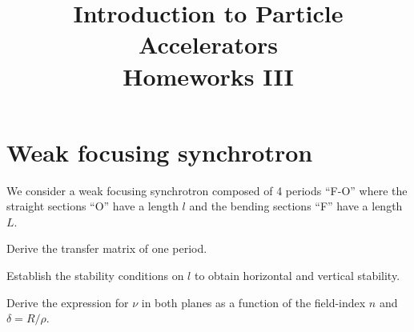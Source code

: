 \documentclass[12pt]{article}
\begin{document}
\title{Introduction to Particle Accelerators\\
\large Homeworks III}
\author{}
\date{}
 
\maketitle
 
\section{Weak focusing synchrotron}
\label{problem1}
We consider a weak focusing synchrotron composed of 4 periods ``F-O'' where the straight sections ``O'' have a length $l$ and the bending sections ``F'' have a length $L$.

Derive the transfer matrix of one period. 

Establish the stability conditions on $l$ to obtain horizontal and vertical stability.

Derive the expression for $\nu$ in both planes as a function of the field-index $n$ and $\delta = R/\rho$.
\end{document}
